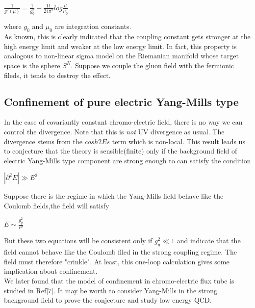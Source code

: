 \documentclass[a4paper,12 pt]{article}
\begin{document}
\begin{center}
$ \frac{1}{g^{2}(\mu)} = \frac{1}{g_{0}^{2}} + \frac{11}{24
\pi^{2}} log\frac{\mu}{\mu_{0}}$
\end{center}
where $ g_{0}$ and $\mu_{0}$ are integration constants.
\\ As known, this is clearly indicated that the coupling
constant gets stronger at the high energy limit and weaker at the
low energy limit. In fact, this property is analogous to
non-linear sigma model on the Riemanian manifold whose target
space is the sphere $ S^{N}$. Suppose we couple the gluon field
with the fermionic fileds, it tends to destroy the effect.
\subsection{Confinement of pure electric Yang-Mills type}
In the case of covariantly constant chromo-electric field, there
is no way we can control the divergence. Note that this is
\emph{not} UV divergence as usual. The divergence stems from the
$cosh2Es $ term which is non-local. This result leads us to
conjecture that the theory is sensible(finite) only if the
background field of electric Yang-Mills type component are strong
enough to can satisfy the condition
\begin{center}
$ |\partial^{2}E| \gg E^{2}$
\end{center}
Suppose there is the regime in which the Yang-Mills field behave
like the Coulomb fields,the field will satisfy

\begin{center}
$ E \sim \frac{g_{y}^{2}}{r^{2}}$
\end{center}
But these two equations will be consistent only if $ g_{y}^{2} \ll
1$ and indicate that the field cannot behave like the Coulomb
filed in the strong coupling regime. The field must therefore
"crinkle". At least, this one-loop calculation gives some
implication about
confinement.\\
We later found that the model of confinement in chromo-electric
flux tube is studied in Ref[7]. It may be worth to consider
Yang-Mills in the strong background field to prove the conjecture
and study low energy QCD.
\end{document}
